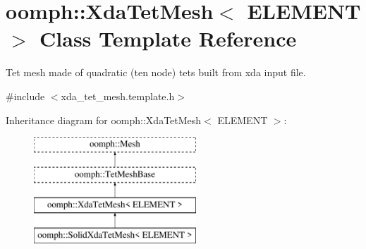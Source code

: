 \hypertarget{classoomph_1_1XdaTetMesh}{}\section{oomph\+:\+:Xda\+Tet\+Mesh$<$ E\+L\+E\+M\+E\+NT $>$ Class Template Reference}
\label{classoomph_1_1XdaTetMesh}


Tet mesh made of quadratic (ten node) tets built from xda input file.  




{\ttfamily \#include $<$xda\+\_\+tet\+\_\+mesh.\+template.\+h$>$}

Inheritance diagram for oomph\+:\+:Xda\+Tet\+Mesh$<$ E\+L\+E\+M\+E\+NT $>$\+:\begin{figure}[H]
\begin{center}
\leavevmode
\includegraphics[height=4.000000cm]{classoomph_1_1XdaTetMesh}
\end{center}
\end{figure}
